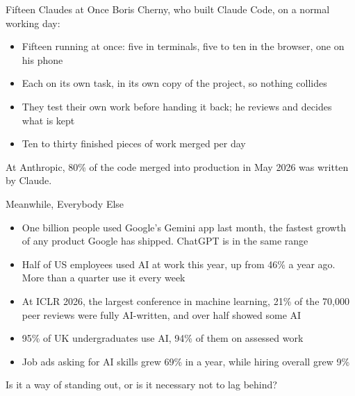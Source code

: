 \documentclass[aspectratio=169]{beamer}
\begin{document}
\begin{frame}{Fifteen Claudes at Once}
    Boris Cherny, who built Claude Code, on a normal working day:

    \vspace{0.8em}
    \begin{itemize}
        \item Fifteen running at once: five in terminals, five to ten in the browser,
              one on his phone
        \item Each on its own task, in its own copy of the project, so nothing collides
        \item They test their own work before handing it back; he reviews and decides what
              is kept
        \item Ten to thirty finished pieces of work merged per day
    \end{itemize}

    \vspace{1.2em}
    At Anthropic, 80\% of the code merged into production in May 2026 was written by Claude.
\end{frame}

\begin{frame}{Meanwhile, Everybody Else}
    \begin{itemize}
        \item One billion people used Google's Gemini app last month, the fastest growth of
              any product Google has shipped. ChatGPT is in the same range
        \item Half of US employees used AI at work this year, up from 46\% a year ago.
              More than a quarter use it every week
        \item At ICLR 2026, the largest conference in machine learning, 21\% of the 70,000
              peer reviews were fully AI-written, and over half showed some AI
        \item 95\% of UK undergraduates use AI, 94\% of them on assessed work
        \item Job ads asking for AI skills grew 69\% in a year, while hiring overall grew 9\%
    \end{itemize}

    \vspace{1em}
    Is it a way of standing out, or is it necessary not to lag behind?
\end{frame}
\end{document}
